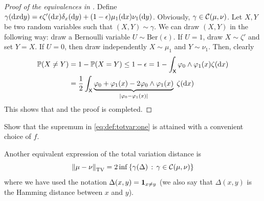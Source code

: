 \documentclass[english,graybox,envcountchap,envcountsame,sectrefs,shortlabels]{svmono}
\theoremstyle{style}
\newenvironment{svmultproof}{\small \begin{proof}}{\end{proof}}
\begin{document}
\begin{svmultproof}[Proof of the equivalences in ]
Define $\gamma(\mathrm{d} x\mathrm{d} y)=\epsilon \zeta'(\mathrm{d} x) \delta _x(\mathrm{d} y)+(1-\epsilon) \mu_1(\mathrm{d} x) \nu_1(\mathrm{d} y)$. Obviously, $\gamma \in \mathcal{C}(\mu,\nu)$. Let $X,Y$ be two random variables such that $(X,Y)\sim\gamma$. We can draw $(X,Y)$ in the following way: draw a Bernoulli variable $U\sim \mathrm{Ber}(\epsilon)$. If $U=1$, draw $X\sim\zeta'$ and set $Y=X$. If $U=0$, then draw independently $X\sim \mu_1$ and $Y\sim \nu_1$. Then, clearly
\begin{align*}
\mathbb{P}(X\neq Y)&=1-\mathbb{P}(X=Y) \leq 1-\epsilon=1-\int_{\mathsf{X}} \varphi_0\wedge \varphi_1(x) \zeta(\mathrm{d} x)\\
&=\frac{1}{2}\int_{\mathsf{X}} \underbrace{\varphi_0+ \varphi_1(x)-2 \varphi_0\wedge \varphi_1(x)}_{|\varphi_0- \varphi_1(x)|}\;\zeta(\mathrm{d} x)
\end{align*}
This shows that  and the proof is completed.
\end{svmultproof}

\begin{exercise}
Show that the supremum in \eqref{eq:def:totvar:one} is attained with a convenient choice of $f$.
\end{exercise}

Another equivalent expression of the total variation distance is
\begin{equation}\label{eq:coupling}
\left\|\mu-\nu\right\|_{\mathrm{TV}}= 2\inf\left\{ \gamma(\Delta) \,:\,\gamma \in \mathcal{C}(\mu,\nu)\right\}
\end{equation}
where we have used the notation $\Delta(x,y)=\mathbf{1}_{x\neq y}$ (we also say that $\Delta(x,y)$ is the Hamming distance between $x$ and $y$).
\end{document}

